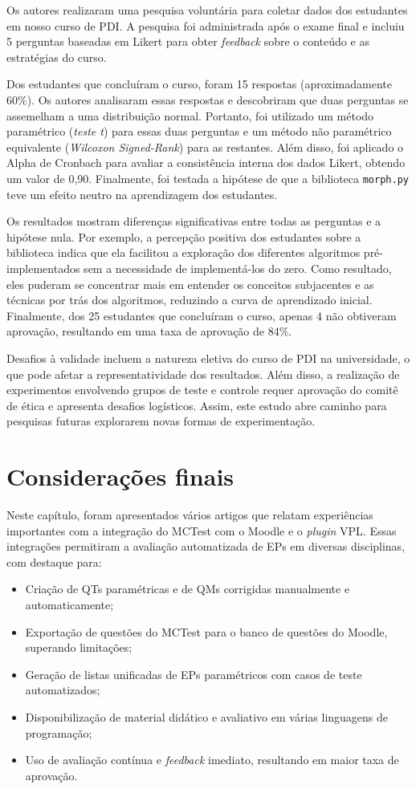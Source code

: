 Os autores realizaram uma pesquisa voluntária para coletar dados dos estudantes em nosso curso de PDI. A pesquisa foi administrada após o exame final e incluiu 5 perguntas baseadas em Likert para obter \textit{feedback} sobre o conteúdo e as estratégias do curso.

Dos estudantes que concluíram o curso, foram 15 respostas (aproximadamente 60\%). Os autores analisaram essas respostas e descobriram que duas perguntas se assemelham a uma distribuição normal. Portanto, foi utilizado um método paramétrico (\textit{teste t}) para essas duas perguntas e um método não paramétrico equivalente (\textit{Wilcoxon Signed-Rank}) para as restantes. Além disso, foi aplicado o Alpha de Cronbach para avaliar a consistência interna dos dados Likert, obtendo um valor de 0,90. Finalmente, foi testada a hipótese de que a biblioteca \texttt{morph.py} teve um efeito neutro na aprendizagem dos estudantes.

Os resultados mostram diferenças significativas entre todas as perguntas e a hipótese nula. Por exemplo, a percepção positiva dos estudantes sobre a biblioteca indica que ela facilitou a exploração dos diferentes algoritmos pré-implementados sem a necessidade de implementá-los do zero. Como resultado, eles puderam se concentrar mais em entender os conceitos subjacentes e as técnicas por trás dos algoritmos, reduzindo a curva de aprendizado inicial. Finalmente, dos 25 estudantes que concluíram o curso, apenas 4 não obtiveram aprovação, resultando em uma taxa de aprovação de 84\%.

Desafios à validade incluem a natureza eletiva do curso de PDI na universidade, o que pode afetar a representatividade dos resultados. Além disso, a realização de experimentos envolvendo grupos de teste e controle requer aprovação do comitê de ética e apresenta desafios logísticos. Assim, este estudo abre caminho para pesquisas futuras explorarem novas formas de experimentação.


\section{Considerações finais}

Neste capítulo, foram apresentados vários artigos que relatam experiências importantes com a integração do MCTest com o Moodle e o \textit{plugin} VPL. Essas integrações permitiram a avaliação automatizada de EPs em diversas disciplinas, com destaque para:

\begin{itemize}
    \item Criação de QTs paramétricas e de QMs corrigidas manualmente e automaticamente;
    \item Exportação de questões do MCTest para o banco de questões do Moodle, superando limitações;
    \item Geração de listas unificadas de EPs paramétricos com casos de teste automatizados;
    \item Disponibilização de material didático e avaliativo em várias linguagens de programação;
    \item Uso de avaliação contínua e \textit{feedback} imediato, resultando em maior taxa de aprovação.
\end{itemize}

